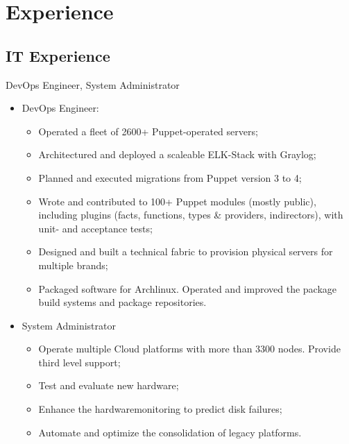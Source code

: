 \documentclass[11pt,a4paper,nolmodern]{moderncv}
\begin{document}
\newpage
\section{Experience}
\subsection{IT Experience}


%
  {DevOps Engineer, System Administrator
\begin{itemize}
  \item DevOps Engineer:
    \begin{itemize}
      \item Operated a fleet of 2600+ Puppet-operated servers;
      \item Architectured and deployed a scaleable ELK-Stack with Graylog;
      \item Planned and executed migrations from Puppet version 3 to 4;
      \item Wrote and contributed to 100+ Puppet modules (mostly public), including plugins (facts, functions, types \& providers, indirectors), with unit- and acceptance tests;
      \item Designed and built a technical fabric to provision physical servers for multiple brands;
      \item Packaged software for Archlinux. Operated and improved the package build systems and package repositories.
    \end{itemize}
  \item System Administrator
    \begin{itemize}
      \item Operate multiple Cloud platforms with more than 3300 nodes. Provide third level support;
      \item Test and evaluate new hardware;
      \item Enhance the hardwaremonitoring to predict disk failures;
      \item Automate and optimize the consolidation of legacy platforms.
    \end{itemize}
\end{itemize}}
\end{document}
